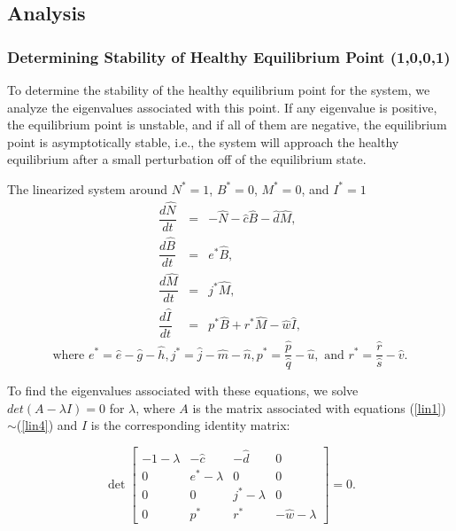 \documentclass[letter,10pt]{article}
\begin{document}
\subsection{Analysis}

\subsubsection{Determining Stability of Healthy Equilibrium Point (1,0,0,1)}
To determine the stability of the healthy equilibrium point for the system, we analyze the eigenvalues associated with this point. If any eigenvalue is positive, the equilibrium point is unstable, and if all of them are negative, the equilibrium point is asymptotically  stable, i.e., the system will approach the healthy equilibrium after a small perturbation off of the equilibrium state.

The linearized system around $N^*=1$, $B^*=0$, $M^*=0$, and $I^*=1$ 
\begin{eqnarray}
\dfrac{d\hat{N}}{dt}&=&-\hat{N}-\hat{c}\hat{B}-\hat{d}\hat{M},\label{lin1}\\
\dfrac{d\hat{B}}{dt}&=&e^*\hat{B}, \\
\dfrac{d\hat{M}}{dt}&=&j^*\hat{M}, \\
\dfrac{d\hat{I}}{dt}&=&p^*\hat{B}+r^*\hat{M}-\hat{w}\hat{I}, \label{lin4}
\end{eqnarray}
\begin{equation}\label{lin_var}
\mbox{where } e^*=\hat{e}-\hat{g}-\hat{h}, j^*=\hat{j}-\hat{m}-\hat{n}, p^*=\dfrac{\hat{p}}{\hat{q}}-\hat{u}, \mbox{ and } r^*=\dfrac{\hat{r}}{\hat{s}}-\hat{v}.
\end{equation}

To find the eigenvalues associated with these equations, we  solve $det(A-\lambda I) = 0$ for $\lambda$, where $A$ is the matrix associated with equations (\ref{lin1})$\sim$(\ref{lin4}) and $I$ is the corresponding identity matrix:

\[\det\left[\begin{array}{cccc}
-1-\lambda & -\hat{c} & -\hat{d} & 0       \\
0 & e^*-\lambda & 0 & 0       \\
0 & 0 & j^*-\lambda & 0       \\
0 & p^* & r^* & -\hat{w}-\lambda
\end{array}\right] = 0.\]
\end{document}
